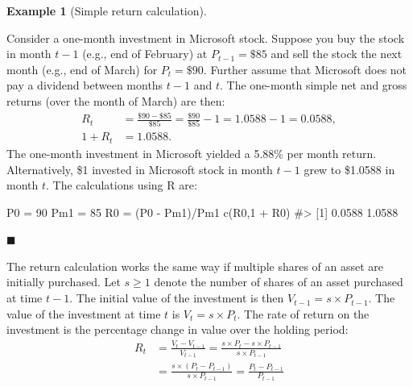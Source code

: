 \documentclass[
  letterpaper,
  DIV=11,
  numbers=noendperiod]{scrreprt}
\newenvironment{Shaded}{\begin{snugshade}}{\end{snugshade}}
\newcommand{\CommentTok}[1]{\textcolor[rgb]{0.37,0.37,0.37}{#1}}
\newcommand{\DecValTok}[1]{\textcolor[rgb]{0.68,0.00,0.00}{#1}}
\newcommand{\FunctionTok}[1]{\textcolor[rgb]{0.28,0.35,0.67}{#1}}
\newcommand{\NormalTok}[1]{\textcolor[rgb]{0.00,0.23,0.31}{#1}}
\newcommand{\OtherTok}[1]{\textcolor[rgb]{0.00,0.23,0.31}{#1}}
\newcommand{\SpecialCharTok}[1]{\textcolor[rgb]{0.37,0.37,0.37}{#1}}
\theoremstyle{definition}
\theoremstyle{definition}
\newtheorem{example}{Example}[chapter]
\theoremstyle{remark}
\begin{document}
\begin{example}[Simple return
calculation]\protect\hypertarget{exm-example0106}{}\label{exm-example0106}

Consider a one-month investment in Microsoft stock. Suppose you buy the
stock in month \(t-1\) (e.g., end of February) at \(P_{t-1}=\$85\) and
sell the stock the next month (e.g., end of March) for \(P_{t}=\$90.\)
Further assume that Microsoft does not pay a dividend between months
\(t-1\) and \(t\). The one-month simple net and gross returns (over the
month of March) are then: \begin{align*}
R_{t} & =\frac{\$90-\$85}{\$85}=\frac{\$90}{\$85}-1=1.0588-1=0.0588,\\
1+R_{t} & =1.0588.
\end{align*} The one-month investment in Microsoft yielded a 5.88\% per
month return. Alternatively, \$1 invested in Microsoft stock in month
\(t-1\) grew to \$1.0588 in month \(t\). The calculations using R are:

\end{example}

\begin{Shaded}
\begin{Highlighting}[]
\NormalTok{P0 }\OtherTok{=} \DecValTok{90} 
\NormalTok{Pm1 }\OtherTok{=} \DecValTok{85} 
\NormalTok{R0 }\OtherTok{=}\NormalTok{ (P0 }\SpecialCharTok{{-}}\NormalTok{ Pm1)}\SpecialCharTok{/}\NormalTok{Pm1 }
\FunctionTok{c}\NormalTok{(R0,}\DecValTok{1} \SpecialCharTok{+}\NormalTok{ R0)}
\CommentTok{\#\textgreater{} [1] 0.0588 1.0588}
\end{Highlighting}
\end{Shaded}

\hfill \(\blacksquare\)

The return calculation works the same way if multiple shares of an asset
are initially purchased. Let \(s \ge 1\) denote the number of shares of
an asset purchased at time \(t-1\). The initial value of the investment
is then \(V_{t-1}=s \times P_{t-1}\). The value of the investment at
time \(t\) is \(V_{t} = s \times P_{t}.\) The rate of return on the
investment is the percentage change in value over the holding period:
\begin{align}
R_{t} &= \frac{V_{t} - V_{t-1}}{V_{t-1}} = \frac{s \times P_{t} - s \times P_{t-1}}{s \times P_{t-1}} \\
&= \frac{s \times(P_{t} - P_{t-1})}{s \times P_{t-1}} = \frac{P_{t} - P_{t-1}}{P_{t-1}}
\end{align}
\end{document}

